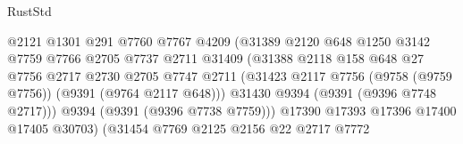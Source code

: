 \begin{lexlean}{RustStd}
\begin{coremodule}
                                          @2121
                                          @1301
                                          @291
                                          @7760
                                          @7767
                                          @4209
                                          (@31389
                                            @2120
                                            @648
                                            @1250
                                            @3142
                                            @7759
                                            @7766
                                            @2705
                                            @7737
                                            @2711
                                            @31409
                                            (@31388
                                              @2118
                                              @158
                                              @648
                                              @27
                                              @7756
                                              @2717
                                              @2730
                                              @2705
                                              @7747
                                              @2711
                                              (@31423
                                                @2117
                                                @7756
                                                (@9758 (@9759 @7756))
                                                (@9391 (@9764 @2117 @648)))
                                              @31430
                                              @9394
                                              (@9391 (@9396 @7748 @2717)))
                                            @9394
                                            (@9391 (@9396 @7738 @7759)))
                                          @17390
                                          @17393
                                          @17396
                                          @17400
                                          @17405
                                          @30703)
                                        (@31454
                                          @7769
                                          @2125
                                          @2156
                                          @22
                                          @2717
                                          @7772

\end{coremodule}
\end{lexlean}
